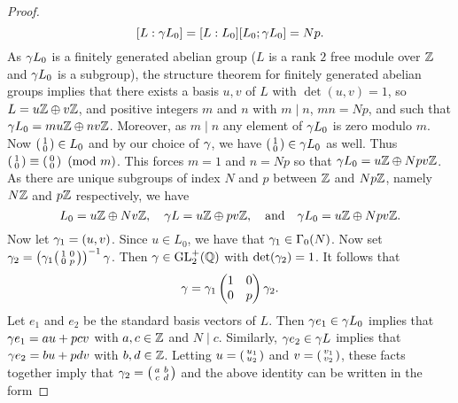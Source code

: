 \begin{proof}
      \[
        [L:\gamma L_{0}] = [L:L_{0}][L_{0};\gamma L_{0}] = Np.
      \]
      As $\gamma L_{0}$ is a finitely generated abelian group ($L$ is a rank $2$ free module over $\mathbb{Z}$ and $\gamma L_{0}$ is a subgroup), the structure theorem for finitely generated abelian groups implies that there exists a basis $u,v$ of $L$ with $\det(u,v) = 1$, so $L = u\mathbb{Z} \oplus v\mathbb{Z}$, and positive integers $m$ and $n$ with $m \mid n$, $mn = Np$, and such that $\gamma L_{0} = mu\mathbb{Z} \oplus nv\mathbb{Z}$. Moreover, as $m \mid n$ any element of $\gamma L_{0}$ is zero modulo $m$. Now $\begin{psmallmatrix} 1 \\ 0 \end{psmallmatrix} \in L_{0}$ and by our choice of $\gamma$, we have $\begin{psmallmatrix} 1 \\ 0 \end{psmallmatrix} \in \gamma L_{0}$ as well. Thus $\begin{psmallmatrix} 1 \\ 0 \end{psmallmatrix} \equiv \begin{psmallmatrix} 0 \\ 0 \end{psmallmatrix} \ \left(\text{mod }m\right)$. This forces $m = 1$ and $n = Np$ so that $\gamma L_{0} = u\mathbb{Z} \oplus Npv\mathbb{Z}$. As there are unique subgroups of index $N$ and $p$ between $\mathbb{Z}$ and $Np\mathbb{Z}$, namely $N\mathbb{Z}$ and $p\mathbb{Z}$ respectively, we have
      \[
        L_{0} = u\mathbb{Z} \oplus Nv\mathbb{Z}, \quad \gamma L = u\mathbb{Z} \oplus pv\mathbb{Z}, \quad \text{and} \quad \gamma L_{0} = u\mathbb{Z} \oplus Npv\mathbb{Z}.
      \]
      Now let $\gamma_{1} = (u,v)$. Since $u \in L_{0}$, we have that $\gamma_{1} \in \Gamma_{0}(N)$. Now set $\gamma_{2} = \left(\gamma_{1}\begin{psmallmatrix} 1 & 0 \\ 0 & p\end{psmallmatrix}\right)^{-1}\gamma$. Then $\gamma \in \mathrm{GL}_{2}^{+}(\mathbb{Q})$ with $\det(\gamma_{2}) = 1$. It follows that
      \[
        \gamma = \gamma_{1}\begin{pmatrix} 1 & 0 \\ 0 & p\end{pmatrix}\gamma_{2}.
      \]
      Let $e_{1}$ and $e_{2}$ be the standard basis vectors of $L$. Then $\gamma e_{1} \in \gamma L_{0}$ implies that $\gamma e_{1} = au+pcv$ with $a,c \in \mathbb{Z}$ and $N \mid c$. Similarly, $\gamma e_{2} \in \gamma L$ implies that $\gamma e_{2} = bu+pdv$ with $b,d \in \mathbb{Z}$. Letting $u = \begin{psmallmatrix} u_{1} \\ u_{2} \end{psmallmatrix}$ and $v = \begin{psmallmatrix} v_{1} \\ v_{2} \end{psmallmatrix}$, these facts together imply that $\gamma_{2} = \begin{psmallmatrix} a & b \\ c & d \end{psmallmatrix}$ and the above identity can be written in the form

\end{proof}
